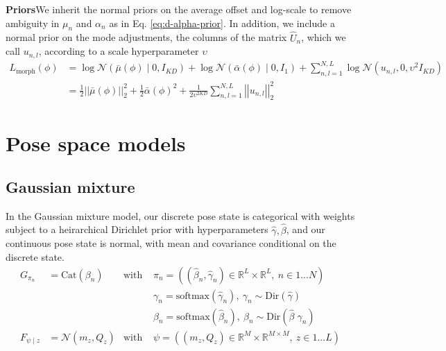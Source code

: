 \documentclass{article}         %
\newcommand{\RR}{\mathbb{R}}
\newcommand{\NN}{\mathcal{N}}
\newcommand{\norm}[1]{\left|\left| #1 \right|\right|}
\newcommand{\pn}[1]{\left( #1 \right)}
\begin{document}
\textbf{Priors}\quad We inherit the normal priors on the average offset and log-scale to remove ambiguity in $\mu_n$ and $\alpha_n$ as in Eq. \ref{eq:d-alpha-prior}. In addition, we include a normal prior on the mode adjustments, the columns of the matrix $\hat{U}_n$, which we call $u_{n,l}$, according to a scale hyperparameter $\upsilon$
\begin{align}
    L_{\text{morph}}(\phi) &= \log \NN\pn{\bar{\mu}(\phi) \mid 0, I_{KD}} + \log \NN\pn{\bar{\alpha}(\phi) \mid 0, I_1} + \sum_{n,l=1}^{N,L}\log \NN(u_{n,l}, 0, \upsilon^2 I_{KD})\\
    &= \frac{1}{2}\norm{\bar{\mu}(\phi)}_2^2 + \frac{1}{2}\bar{\alpha}(\phi)^2 + \frac{1}{2\upsilon^{2KD}}\sum_{n,l=1}^{N,L}\norm{u_{n, l}}_2^2
\end{align}



\section{Pose space models}


\subsection{Gaussian mixture}

In the Gaussian mixture model, our discrete pose state is categorical with weights subject to a heirarchical Dirichlet prior with hyperparameters $\hat\gamma, \hat\beta$, and our continuous pose state is normal, with mean and covariance conditional on the discrete state.
\begin{align*}
    G_{\pi_n} &= \text{Cat}(\beta_n) & \text{with\ }&\pi_n = ((\hat\beta_n, \hat\gamma_n)\in \RR^L\times \RR^L,\ n\in1...N) \\
    &&& \gamma_n = \text{softmax}(\hat\gamma_n),\ \gamma_n \sim \text{Dir}(\hat\gamma) \\
    &&& \beta_n = \text{softmax}(\hat\beta_n),\ \beta_n \sim \text{Dir}(\hat\beta\;\gamma_n) \\
    F_{\psi\mid z} &= \NN(m_z, Q_z) & \text{with\ }&\psi = ((m_z, Q_z) \in \RR^{M} \times \RR^{M\times M},\ z\in 1 ... L)
\end{align*}
\end{document}
